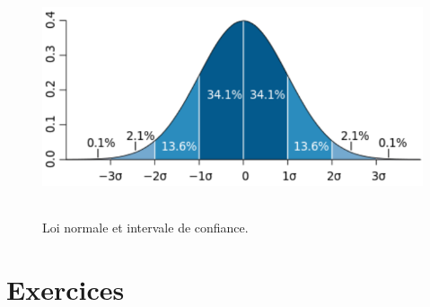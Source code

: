\begin{figure}
\centering
\includegraphics[height=7cm]{assets/figures/3_9_Loi_normale_et_intervale_de_confiance.PNG}
\caption{Loi normale et intervale de confiance.}
\label{fig:3_9_Loi_normale_et_intervale_de_confiance}
\end{figure}

\section{Exercices }

